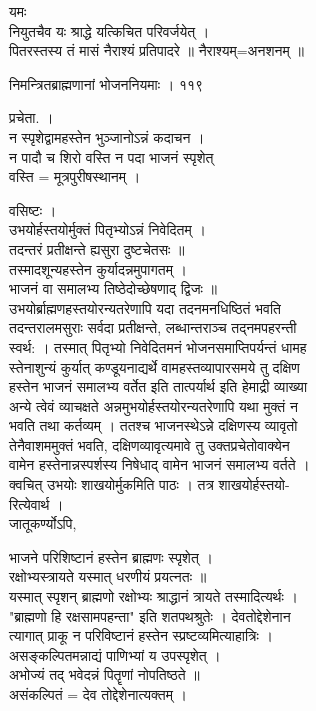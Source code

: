 \documentclass[11pt, openany]{book}
\begin{document}
{{{यमः\\
नियुतचैव यः श्राद्धे यत्किचित परिवर्जयेत् ।\\
पितरस्तस्य तं मासं नैराश्यं प्रतिपादरे ॥ नैराश्यम्=अनशनम् ॥

  निमन्त्रितब्राह्मणानां भोजननियमाः । ११९

{प्रचेता. ।\\
न स्पृशेद्वामहस्तेन भुञ्जानोऽन्नं कदाचन ।\\
न पादौ च शिरो वस्ति न पदा भाजनं स्पृशेत् \textbar{}\textbar{}\\
वस्ति = मूत्रपुरीषस्थानम् ।

{वसिष्टः ।\\
उभयोर्हस्तयोर्मुक्तं पितृभ्योऽन्नं निवेदितम् ।\\
तदन्तरं प्रतीक्षन्ते ह्यसुरा दुष्टचेतसः ॥\\
तस्मादशून्यहस्तेन कुर्यादन्नमुपागतम् ।\\
भाजनं वा समालभ्य तिष्ठेदोच्छेषणाद् द्विजः ॥\\
उभयोर्ब्राह्मणहस्तयोरन्यतरेणापि यदा तदनमनधिष्ठितं भवति\\
तदन्तरालमसुराः सर्वदा प्रतीक्षन्ते, लब्धान्तराञ्च तद्नमपहरन्ती\\
स्वर्थ: । तस्मात् पितृभ्यो निवेदितमनं भोजनसमाप्तिपर्यन्तं धामह\\
स्तेनाशुन्यं कुर्यात् कण्डूयनाद्यर्थे वामहस्तव्यापारसमये तु दक्षिण\\
हस्तेन भाजनं समालभ्य वर्तेत इति तात्पर्यार्थ इति हेमाद्री व्याख्या
\textbar{}\\
अन्ये त्वेवं व्याचक्षते अन्नमुभयोर्हस्तयोरन्यतरेणापि यथा मुक्तं न\\
भवति तथा कर्तव्यम् । ततश्च भाजनस्थेऽन्ने दक्षिणस्य व्यावृतो\\
तेनैवाशममुक्तं भवति, दक्षिणव्यावृत्यमावे तु उक्तप्रचेतोवाक्येन\\
वामेन हस्तेनान्नस्पर्शस्य निषेधाद् वामेन भाजनं समालभ्य वर्तते ।\\
क्वचित् उभयोः शाखयोर्मुकमिति पाठः । तत्र शाखयोर्हस्तयो-\\
रित्येवार्थ ।\\
जातूकर्ण्योऽपि,

{भाजने परिशिष्टानं हस्तेन ब्राह्मणः स्पृशेत् ।\\
रक्षोभ्यस्त्रायते यस्मात् धरणीयं प्रयत्नतः ॥\\
यस्मात् स्पृशन् ब्राह्मणो रक्षोभ्यः श्राद्धानं त्रायते तस्मादित्यर्थः
।\\
"ब्राह्मणो हि रक्षसामपहन्ता" इति शतपथश्रुतेः । देवतोद्देशेनान\\
त्यागात् प्राकू न परिविष्टानं हस्तेन स्प्रष्टव्यमित्याहात्रिः ।\\
असङ्कल्पितमन्नाद्यं पाणिभ्यां य उपस्पृशेत् ।\\
अभोज्यं तद् भवेदन्नं पितॄणां नोपतिष्ठते ॥\\
असंकल्पितं = देव तोद्देशेनात्यक्तम् । 

}}}}}}
\end{document}
